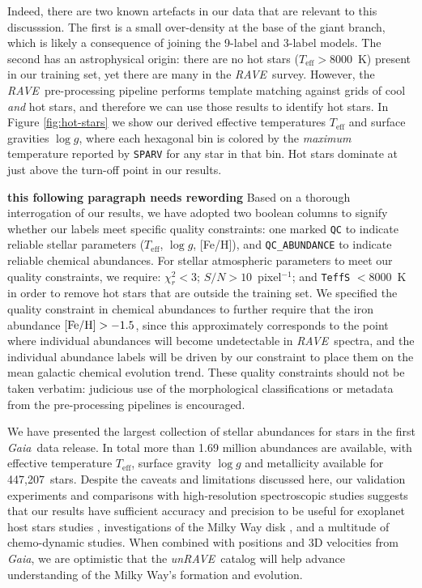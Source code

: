 \documentclass[preprint,trackchanges]{aastex}
\newcommand{\acronym}[1]{{\small{#1}}}
\newcommand{\project}[1]{\textsl{#1}}
\newcommand{\gaia}{\project{Gaia}}
\newcommand{\rave}{\project{\acronym{RAVE}}}
\newcommand{\unrave}{\project{unRAVE}}
\newcommand{\stub}[1]{{\color{blue} \textbf{#1}}}
\newcommand{\teff}{T_{\mathrm{eff}}}
\newcommand{\logg}{\log g}
\newcommand{\Nstarsqc}{447,207} %
\begin{document}
Indeed, there are two known artefacts in our data that are relevant to this discusssion. The
first is a small over-density at the base of the giant branch, which is
likely a consequence of joining the 9-label and 3-label models.  The
second has an astrophysical origin: there are no hot stars ($\teff > 8000$~K)
present in our training set, yet there are many in the \rave\ survey.
However, the \rave\ pre-processing pipeline \citep[\texttt{SPARV};][]{Steinmetz_2006,Zwitter_2008} performs
template matching against grids of cool \emph{and} hot stars, and therefore
we can use those results to identify hot stars. In Figure \ref{fig:hot-stars} 
we show our derived effective temperatures $\teff$ and surface gravities $\logg$,
where each hexagonal bin is colored by the \emph{maximum} temperature
reported by \texttt{SPARV} for any star in that bin.  Hot stars dominate
at just above the turn-off point in our results. 


\stub{this following paragraph needs rewording}
Based on a thorough interrogation of our results, we have adopted two boolean
columns to signify whether our labels meet specific quality constraints:
one marked \texttt{QC} to indicate reliable stellar parameters ($\teff$, $\logg$, [Fe/H]), and \texttt{QC\_ABUNDANCE} to indicate reliable chemical abundances.
For stellar atmospheric parameters to meet our quality constraints, we
require: $\chi_r^2 < 3$; $S/N >10$~pixel$^{-1}$; and \texttt{TeffS} $< 8000$~K
in order to remove hot stars that are outside the training set.  We
specified the quality constraint in chemical abundances to further
require that the iron abundance $[{\rm Fe/H}] > -1.5$, since this approximately
corresponds to the point where individual abundances will become undetectable
in \rave\ spectra, and the individual abundance labels will be driven by our
constraint to place them on the mean galactic chemical evolution trend.
These quality constraints should not be taken verbatim: judicious use of
the morphological classifications \citep{Matijevic_2012} or metadata from
the pre-processing pipelines is encouraged.


We have presented the largest collection of stellar abundances for stars in the 
first \gaia\ data release.  In total more than 1.69 million abundances are
available, with effective temperature $\teff$, surface gravity $\logg$ and 
metallicity available for \Nstarsqc\ stars.  Despite the caveats and limitations 
discussed here, our validation experiments and comparisons with high-resolution
spectroscopic studies suggests that our results have sufficient accuracy and
precision to be useful for exoplanet host stars studies 
\citep[c.f.,][]{Valenti_Fischer_2005}, investigations of the Milky Way disk 
\citep[c.f.,][]{Reddy_2003,Reddy_2006,Bensby_2014}, and a multitude of 
chemo-dynamic studies.  When combined with positions and 3D velocities from \gaia,
we are optimistic that the \unrave\ catalog will help advance understanding 
of the Milky Way's formation and evolution.
\end{document}
